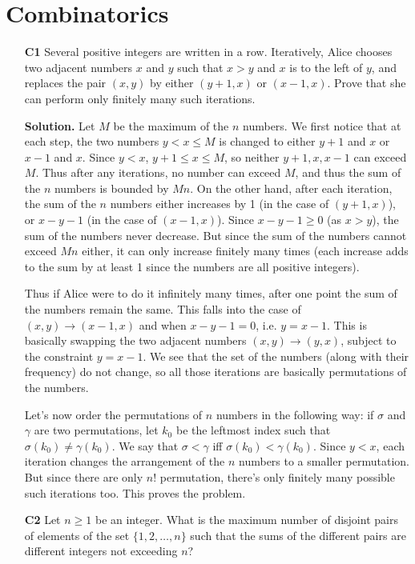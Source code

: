 \documentclass[11pt,a4paper]{article}
\begin{document}
	\section*{Combinatorics}
	\begin{enumerate}
		\item [\textbf{C1}] Several positive integers are written in a row. Iteratively, Alice chooses two adjacent numbers $x$ and $y$ such that $x>y$ and $x$ is to the left of $y$, and replaces the pair $(x,y)$ by either $(y+1,x)$ or $(x-1,x)$. Prove that she can perform only finitely many such iterations.
		
		\textbf{Solution.} Let $M$ be the maximum of the $n$ numbers. We first notice that at each step, the two numbers $y<x\le M$ is changed to either $y+1$ and $x$ or $x-1$ and $x$. Since $y<x$, $y+1\le x\le M$, so neither $y+1, x, x-1$ can exceed $M$. Thus after any iterations, no number can exceed $M$, and thus the sum of the $n$ numbers is bounded by $Mn$. 
		On the other hand, after each iteration, the sum of the $n$ numbers either increases by 1 (in the case of $(y+1, x)$), or $x-y-1$ (in the case of $(x-1, x)$). Since $x-y-1\ge 0$ (as $x>y$), the sum of the numbers never decrease. But since the sum of the numbers cannot exceed $Mn$ either, it can only increase finitely many times (each increase adds to the sum by at least 1 since the numbers are all positive integers). 
		
		Thus if Alice were to do it infinitely many times, after one point the sum of the numbers remain the same. This falls into the case of $(x, y)\to (x-1, x)$ and when $x-y-1=0$, i.e. $y=x-1$. This is basically swapping the two adjacent numbers $(x, y)\to (y, x)$, subject to the constraint $y=x-1$. 
		We see that the set of the numbers (along with their frequency) do not change, so all those iterations are basically permutations of the numbers. 
		
		Let's now order the permutations of $n$ numbers in the following way: if $\sigma$ and $\gamma$ are two permutations, let $k_0$ be the leftmost index such that $\sigma(k_0)\neq \gamma(k_0)$. We say that $\sigma<\gamma$ iff $\sigma(k_0)<\gamma(k_0)$. Since $y<x$, each iteration changes the arrangement of the $n$ numbers to a smaller permutation. But since there are only $n!$ permutation, there's only finitely many possible such iterations too. This proves the problem. 
		
		\item [\textbf{C2}] Let $n \geq 1$ be an integer. What is the maximum number of disjoint pairs of elements of the set $\{ 1,2,\ldots , n \}$ such that the sums of the different pairs are different integers not exceeding $n$?
		

\end{enumerate}
\end{document}

